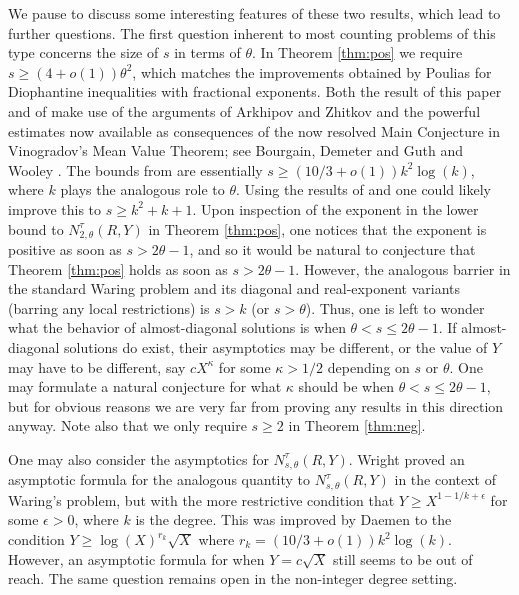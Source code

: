\documentclass[11pt,reqno]{amsart}
\numberwithin{equation}{section}
\begin{document}
We pause to discuss some interesting features of these two results, which lead to further questions. The first question inherent to most counting problems of this type concerns the size of $s$ in terms of $\theta$. In Theorem \ref{thm:pos} we require $s \geq (4+o(1))\theta^2$, which matches the improvements obtained by Poulias \cite{Poulias1} for Diophantine inequalities with fractional exponents. Both the result of this paper and of \cite{Poulias1} make use of the arguments of Arkhipov and Zhitkov \cite{ArkhZhit} and the powerful estimates now available as consequences of the now resolved Main Conjecture in Vinogradov's Mean Value Theorem; see Bourgain, Demeter and Guth \cite{BDG} and Wooley \cite{WooNEC}. The bounds from \cite{DaemenAA1} are essentially $s \geq (10/3+o(1))k^2\log(k)$, where $k$ plays the analogous role to $\theta$. Using the results of \cite{BDG} and \cite{WooNEC} one could likely improve this to $s \geq k^2+k+1$. Upon inspection of the exponent in the lower bound to $N_{2,\theta}^{\tau}(R,Y)$ in Theorem \ref{thm:pos}, one notices that the exponent is positive as soon as $s > 2\theta-1$, and so it would be natural to conjecture that Theorem \ref{thm:pos} holds as soon as $s > 2 \theta-1$. However, the analogous barrier in the standard Waring problem and its diagonal and real-exponent variants (barring any local restrictions) is $s > k$ (or $s > \theta$). Thus, one is left to wonder what the behavior of almost-diagonal solutions is when $\theta < s \leq 2\theta -1$. If almost-diagonal solutions do exist, their asymptotics may be different, or the value of $Y$ may have to be different, say $cX^{\kappa}$ for some $\kappa > 1/2$ depending on $s$ or $\theta$. One may formulate a natural conjecture for what $\kappa$ should be when $\theta < s \leq 2\theta-1$, but for obvious reasons we are very far from proving any results in this direction anyway. Note also that we only require $s \geq 2$ in Theorem \ref{thm:neg}. 

One may also consider the asymptotics for $N_{s,\theta}^{\tau}(R,Y)$. Wright \cite{WrightAsymp} proved an asymptotic formula for the analogous quantity to $N_{s,\theta}^{\tau}(R,Y)$ in the context of Waring's problem, but with the more restrictive condition that $Y \geq X^{1-1/k+\epsilon}$ for some $\epsilon > 0$, where $k$ is the degree. This was improved by Daemen \cite{DaemenBLMS} to the condition $Y \geq \log(X)^{r_k}\sqrt{X}$ where $r_k = (10/3 +o(1))k^2\log(k)$. 
However, an asymptotic formula for when $Y = c\sqrt{X}$ still seems to be out of reach. 
The same question remains open in the non-integer degree setting. 
\end{document}

